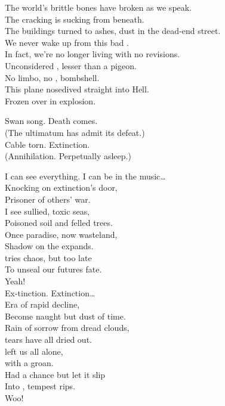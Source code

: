 
The world's brittle bones have broken as we speak. \\
The cracking  is sucking from beneath. \\
The buildings turned to ashes, dust in the dead-end street. \\
We never wake up from this bad . \\

In fact, we're no longer living with no revisions. \\
Unconsidered , lesser than a pigeon. \\
No limbo, no , bombshell. \\
This plane nosedived straight into Hell. \\
Frozen over in explosion. \\


Swan song. Death comes. \\
(The ultimatum has admit its defeat.) \\
Cable torn. Extinction. \\
(Annihilation. Perpetually asleep.) \\




I can see everything. I can be in the music… \\

Knocking on extinction's door, \\
Prisoner of others' war. \\
I see sullied, toxic seas, \\
Poisoned soil and felled trees. \\
Once paradise, now wasteland, \\
Shadow on the  expands. \\
 tries chaos, but too late \\
To unseal our futures fate. \\
Yeah! \\

Ex-tinction. Extinction… \\

Era of rapid decline, \\
Become naught but dust of time. \\
Rain of sorrow from dread clouds, \\
 tears have all dried out. \\
 left us all alone, \\
 with a groan. \\
Had a chance but let it slip \\
Into , tempest rips. \\
Woo! \\

